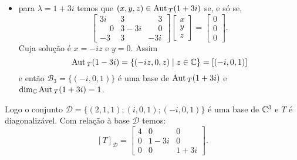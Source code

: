 \begin{exemplo}
\begin{enumerate}[label={\arabic*})]
\begin{solucao}
\begin{itemize}
                \item para $\lambda = 1 + 3i$ temos que $(x,y,z) \in {\rm Aut\,}_T(1 + 3i)$ se, e s\'o se,
                \[
                    \begin{bmatrix}
                        3i & 3 & \phantom{-}3\\
                        \phantom{-}0 & 3 - 3i & \phantom{-}0\\
                        -3 & 3 & -3i
                    \end{bmatrix}\begin{bmatrix}
                        x\\y\\z
                    \end{bmatrix} = \begin{bmatrix}
                        0\\0\\0
                    \end{bmatrix}.
                \]
                Cuja solução é $x = -iz$ e $y = 0$. Assim
                \[
                    {\rm Aut\,}_T(1 - 3i) = \{(-iz,0,z) \mid z \in \mathbb{C}\} = [(-i,0,1)]
                \]
                e então $\mathcal{B}_3 = \{(-i,0,1)\}$ é uma base de ${\rm Aut\,}_T(1 + 3i)$ e $\dim_{\mathbb{C}}{\rm Aut\,}_T(1 + 3i) = 1$.
            \end{itemize}

            Logo o conjunto $\mathcal{D} = \{(2, 1, 1); (i, 0, 1); (-i, 0, 1)\}$ é uma base de $\mathbb{C}^3$ e $T$ é diagonalizável.
            Com relação à base $\mathcal{D}$ temos:
            \[
                [T]_\mathcal{D} = \begin{bmatrix}4 & 0 & 0\\0 & 1 - 3i & 0\\0 & 0 & 1 + 3i\end{bmatrix}.
            \]
            \end{solucao}


\end{enumerate}
\end{exemplo}
